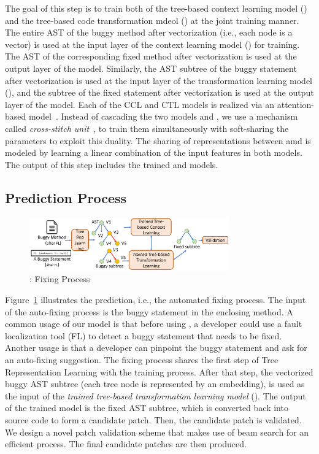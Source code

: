The goal of this step is to train both of the tree-based context
learning model () and the tree-based code transformation
mdeol () at the joint training manner. The entire AST of the
buggy method after vectorization (i.e., each node is a vector) is used
at the input layer of the context learning model () for
training. The AST of the corresponding fixed method after
vectorization is used at the output layer of the 
model. Similarly, the AST subtree of the buggy statement after
vectorization is used at the input layer of the transformation
learning model (), and the subtree of the fixed statement
after vectorization is used at the output layer of the 
model. Each of the CCL and CTL models is realized via an
attention-based  model~\cite{yi}. Instead of cascading
the two models  and , we use a mechanism called
{\em cross-stitch unit}~\cite{misra2016cross}, to train them
simultaneously with soft-sharing the parameters to exploit this
duality. The sharing of representations between  amd
 is modeled by learning a linear combination of the input
features in both models. The output of this step includes the trained
 and  models.

\subsection{Prediction Process}

\begin{figure}[t]
	\centering
	\includegraphics[width=3.4in]{graphs/overview-predict.png}
	\caption{{\tool}: Fixing Process}
	\label{overview-fixing}
\end{figure}

Figure~\ref{overview-fixing} illustrates the prediction, i.e., the
automated fixing process. The input of the auto-fixing process is the
buggy statement in the enclosing method. A common usage of our model
is that before using {\tool}, a developer could use a fault
localization tool (FL) to detect a buggy statement that needs to be
fixed. Another usage is that a developer can pinpoint the buggy
statement and ask {\tool} for an auto-fixing suggestion. The fixing
process shares the first step of Tree Representation Learning with the
training process. After that step, the vectorized buggy AST subtree
(each tree node is represented by an embedding), is used as the input
of the {\em trained tree-based transformation learning model}
(). The output of the trained  model is the fixed
AST subtree, which is converted back into source code to form a
candidate patch. Then, the candidate patch is validated. We design a
novel patch validation scheme that makes use of beam search for an
efficient process. The final candidate patches are then produced.

